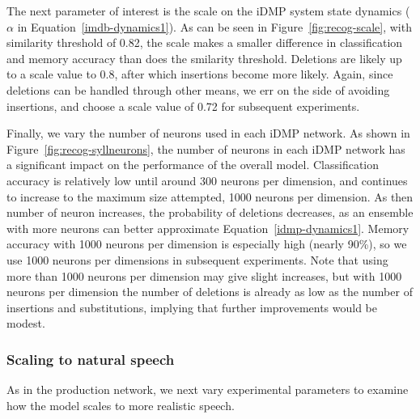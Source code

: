 
The next parameter of interest is the
scale on the iDMP system state dynamics
($\alpha$ in Equation~\eqref{imdb-dynamics1}).
As can be seen in Figure~\ref{fig:recog-scale},
with similarity threshold of 0.82,
the scale makes a smaller difference
in classification and memory accuracy
than does the smilarity threshold.
Deletions are likely up to
a scale value to 0.8,
after which insertions become more likely.
Again, since deletions can be handled
through other means,
we err on the side of avoiding insertions,
and choose a scale value of 0.72
for subsequent experiments.


Finally, we vary the number of neurons
used in each iDMP network.
As shown in Figure~\ref{fig:recog-syllneurons},
the number of neurons in each iDMP network
has a significant impact on the performance
of the overall model.
Classification accuracy is relatively low
until around 300 neurons per dimension,
and continues to increase
to the maximum size attempted,
1000 neurons per dimension.
As then number of neuron increases,
the probability of deletions decreases,
as an ensemble with more neurons
can better approximate Equation~\eqref{idmp-dynamics1}.
Memory accuracy with 1000 neurons per dimension
is especially high (nearly 90\%),
so we use 1000 neurons per dimensions
in subsequent experiments.
Note that using more than 1000 neurons per dimension
may give slight increases,
but with 1000 neurons per dimension
the number of deletions is already
as low as the number of insertions
and substitutions,
implying that further improvements
would be modest.

\subsubsection{Scaling to natural speech}

As in the production network,
we next vary experimental parameters
to examine how the model scales
to more realistic speech.


